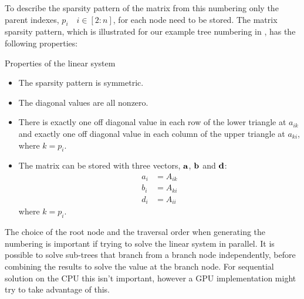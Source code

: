 To describe the sparsity pattern of the matrix from this numbering only the parent indexes, $p_i\quad i\in[2:n]$, for each node need to be stored. The matrix sparsity pattern, which is illustrated for our example tree numbering in , has the following properties:
\begin{infobox}{Properties of the linear system}
\begin{itemize}[leftmargin=*]
    \item
        The sparsity pattern is symmetric.
    \item
        The diagonal values are all nonzero.
    \item
        There is exactly one off diagonal value in each row of the lower triangle at $a_{ik}$ and exactly one off diagonal value in each column of the upper triangle at $a_{ki}$, where $k=p_i$.
    \item
        The matrix can be stored with three vectors, $\mathbf{a}$, $\mathbf{b}$ and $\mathbf{d}$:
        \begin{align}
            a_i &= A_{ik} \\
            b_i &= A_{ki} \\
            d_i &= A_{ii}
        \end{align}
        where $k=p_i$.
\end{itemize}
\end{infobox}

\begin{note}
The choice of the root node and the traversal order when generating the numbering is important if trying to solve the linear system in parallel. It is possible to solve sub-trees that branch from a branch node independently, before combining the results to solve the value at the branch node. For sequential solution on the CPU this isn't important, however a GPU implementation might try to take advantage of this.
\end{note}
